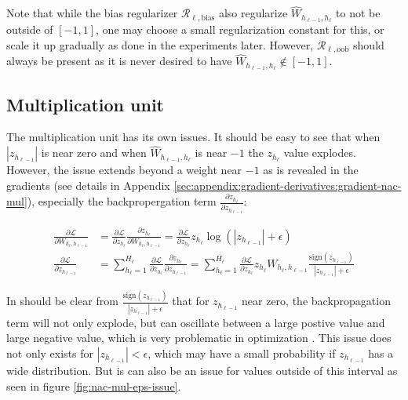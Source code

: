 Note that while the bias regularizer $\mathcal{R}_{\ell,\mathrm{bias}}$ also regularize $\hat{W}_{h_{\ell-1},h_\ell}$ to not be outside of $[-1, 1]$, one may choose a small regularization constant for this, or scale it up gradually as done in the experiments later. However, $\mathcal{R}_{\ell,\mathrm{oob}}$ should always be present as it is never desired to have $\hat{W}_{h_{\ell-1},h_\ell} \not\in [-1, 1]$.

\subsection{Multiplication unit}

The multiplication unit has its own issues. It should be easy to see that when $|z_{h_{\ell-1}}|$ is near zero and when $\hat{W}_{h_{\ell-1},h_\ell}$ is near $-1$ the $z_{h_\ell}$ value explodes. However, the issue extends beyond a weight near $-1$ as is revealed in the gradients (see details in Appendix \ref{sec:appendix:gradient-derivatives:gradient-nac-mul}), especially the backpropergation term $\frac{\partial z_{h_\ell}}{\partial z_{h_{\ell-1}}}$:

\begin{equation}
\begin{aligned}
\frac{\partial \mathcal{L}}{\partial W_{h_{\ell}, h_{\ell - 1}}} &= \frac{\partial \mathcal{L}}{\partial z_{h_\ell}} \frac{\partial z_{h_\ell}}{\partial W_{h_{\ell}, h_{\ell - 1}}} = \frac{\partial \mathcal{L}}{\partial z_{h_\ell}} z_{h_\ell} \log(|z_{h_{\ell-1}}| + \epsilon) \\
\frac{\partial \mathcal{L}}{\partial z_{h_{\ell-1}}} &= \sum_{h_\ell = 1}^{H_\ell} \frac{\partial \mathcal{L}}{\partial z_{h_\ell}} \frac{\partial z_{h_\ell}}{\partial z_{h_{\ell-1}}} = \sum_{h_\ell = 1}^{H_\ell} \frac{\partial \mathcal{L}}{\partial z_{h_\ell}} z_{h_\ell} W_{h_\ell, h_{\ell-1}} \frac{\mathrm{sign}(z_{h_{\ell-1}})}{|z_{h_{\ell-1}}| + \epsilon}
\end{aligned}
\end{equation}

In should be clear from $\frac{\mathrm{sign}(z_{h_{\ell-1}})}{|z_{h_{\ell-1}}| + \epsilon}$ that for $z_{h_{\ell-1}}$ near zero, the backpropagation term will not only explode, but can oscillate between a large postive value and large negative value, which is very problematic in optimization \cite{adam-optimization}. This issue does not only exists for $|z_{h_{\ell-1}}| < \epsilon$, which may have a small probability if $z_{h_{\ell-1}}$ has a wide distribution. But is can also be an issue for values outside of this interval as seen in figure \ref{fig:nac-mul-eps-issue}.

